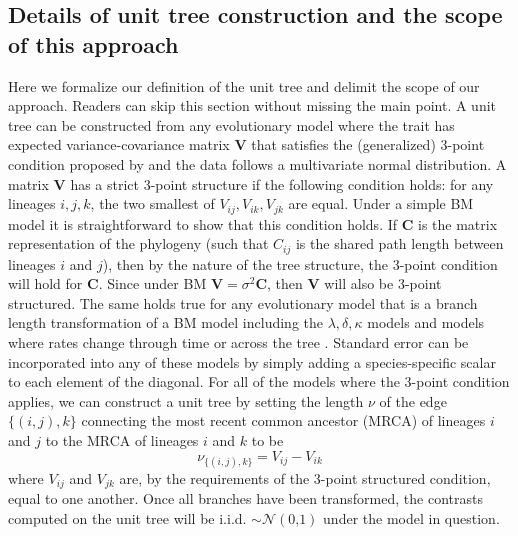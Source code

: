 \subsection{Details of unit tree construction and the scope of this approach}

Here we formalize our definition of the unit tree and delimit the scope of our approach. Readers can skip this section without missing the main point. A unit tree can be constructed from any evolutionary model where the trait has expected variance-covariance matrix $\mathbf{V}$ that satisfies the (generalized) 3-point condition proposed by \citet{Ho2014} and the data follows a multivariate normal distribution. A matrix $\mathbf{V}$ has a strict 3-point structure if the following condition holds: for any lineages $i,j,k$, the two smallest of $V_{ij}, V_{ik}, V_{jk}$ are equal. Under a simple BM model it is straightforward to show that this condition holds. If $\mathbf{C}$ is the matrix representation of the phylogeny (such that $C_{ij}$ is the shared path length between lineages $i$ and $j$), then by the nature of the tree structure, the 3-point condition will hold for $\mathbf{C}$. Since under BM $\mathbf{V}=\sigma^2\mathbf{C}$, then $\mathbf{V}$ will also be 3-point structured. The same holds true for any evolutionary model that is a branch length transformation of a BM model including the $\lambda, \delta, \kappa$ models \citep{Pagel1997,Pagel1999} and models where rates change through time \citep[the ``Early Burst'' or EB model, also referred to as the Accelerating/Decelerating Change, ACDC, model;][]{Blomberg2003, Harmon2010} or across the tree \citep{Omeara2006, Thomas2006, Eastman2011, Revell2012, motmot}. Standard error can be incorporated into any of these models by simply adding a species-specific scalar to each element of the diagonal. For all of the models where the 3-point condition applies, we can construct a unit tree by setting the length $\nu$ of the edge $\lbrace (i,j),k \rbrace$ connecting the most recent common ancestor (MRCA) of lineages $i$ and $j$ to the MRCA of lineages $i$ and $k$ to be
\begin{equation}\label{eq:ut}
\nu_{\lbrace (i,j),k \rbrace} = V_{ij} - V_{ik}
\end{equation}
where $V_{ij}$ and $V_{jk}$ are, by the requirements of the 3-point structured condition, equal to one another. Once all branches have been transformed, the contrasts computed on the unit tree will be i.i.d. $\sim \mathcal{N}(\text{0,1})$ under the model in question. 

